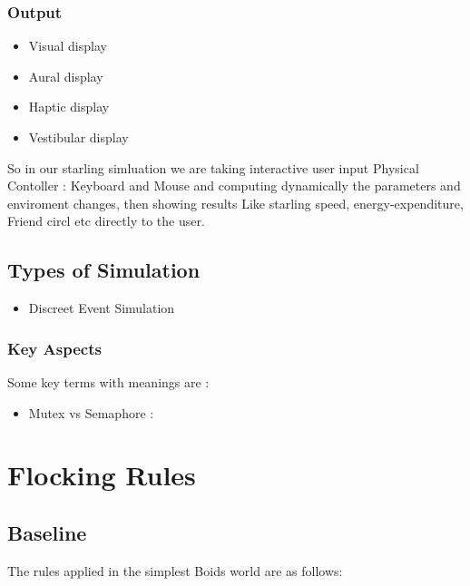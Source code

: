 \documentclass[12pt]{report}
\begin{document}
\subsection{Output}
\begin{itemize}
  \item Visual display
  \item Aural display
  \item Haptic display
  \item Vestibular display
\end{itemize}

So in our starling simluation we are taking interactive user input {Physical Contoller : Keyboard and Mouse} and computing dynamically the parameters and enviroment changes, then showing results {Like starling speed, energy-expenditure, Friend circl etc} directly to the user.  

\section{Types of Simulation}
\begin{itemize}
  \item Discreet Event Simulation
\end{itemize}
\subsection{Key Aspects}
Some key terms with meanings are : 
\begin{itemize}
  \item Mutex vs Semaphore : 
\end{itemize}

\chapter{Flocking Rules}
\section{Baseline}
\label{sec:baseline}
The rules applied in the simplest Boids world are as follows:
\end{document}
